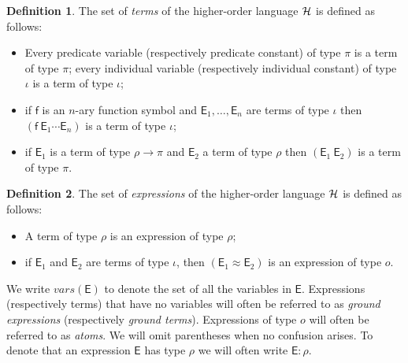 \documentclass[submission,copyright]{eptcs}
\theoremstyle{definition}
\newtheorem{definition}{Definition}
\begin{document}
\begin{definition}
The set of {\em terms} of the higher-order language ${\cal H}$ is defined as follows:
\begin{itemize}
  \item Every predicate variable (respectively predicate constant) of type $\pi$ is a
        term of type $\pi$; every individual variable (respectively individual constant)
        of type $\iota$ is a term of type $\iota$;
  \item if $\mathsf{f}$ is an $n$-ary function symbol and $\mathsf{E}_1, \ldots, \mathsf{E}_n$
        are terms of type $\iota$ then $(\mathsf{f}\ \mathsf{E}_1\cdots\mathsf{E}_n)$ is
        a term of type $\iota$;
  \item if $\mathsf{E}_1$ is a term of type $\rho \rightarrow \pi$ and
        $\mathsf{E}_2$ a term of type $\rho$ then $(\mathsf{E}_1\ \mathsf{E}_2)$ is a term of type $\pi$.
\end{itemize}
\end{definition}
\begin{definition}
The set of {\em expressions} of the higher-order language ${\cal H}$ is defined as follows:
\begin{itemize}
\item A term of type $\rho$ is an expression of type $\rho$;
\item if $\mathsf{E}_1$ and $\mathsf{E}_2$ are terms of type $\iota$, then $(\mathsf{E}_1\approx \mathsf{E}_2)$ is an expression of type $o$.
\end{itemize}
\end{definition}
We write $vars(\mathsf{E})$ to denote the set of all the variables in $\mathsf{E}$.
Expressions (respectively terms) that have no variables will often be referred to as {\em ground expressions} (respectively {\em ground terms}). Expressions of type $o$ will often be referred to as {\em atoms}. We will omit parentheses
when no confusion arises. To denote that an expression $\mathsf{E}$ has type $\rho$ we will often write $\mathsf{E}:\rho$.
\end{document}
